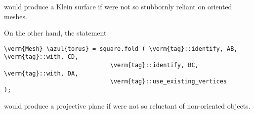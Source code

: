 \noindent would produce a Klein surface if {\maniFEM} were not so stubbornly reliant on
oriented meshes.

\vfill\eject
On the other hand, the statement

\begin{Verbatim}[commandchars=\\\{\},formatcom=\small\tt,
   baselinestretch=0.94,framesep=2mm                     ]
   \verm{Mesh} \azul{torus} = square.fold ( \verm{tag}::identify, AB, \verm{tag}::with, CD,
                              \verm{tag}::identify, BC, \verm{tag}::with, DA,
                              \verm{tag}::use_existing_vertices       );
\end{Verbatim}

\noindent would produce a projective plane if {\maniFEM} were not so reluctant of
non-oriented objects.

